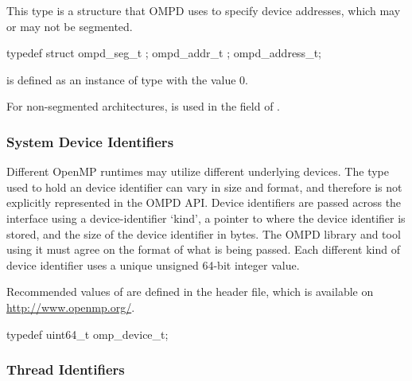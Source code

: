 \label{subsubsubsec:ompd_address_t}

This type is a structure that OMPD uses to specify device addresses,
which may or may not be segmented.

\format

\begin{ccppspecific}
\begin{ompEnv}
typedef struct {
  ompd_seg_t ;
  ompd_addr_t ;
} ompd_address_t;
\end{ompEnv}
\end{ccppspecific}

 is defined as an instance of type  with 
the value 0.

For non-segmented architectures,  is used in the 
 field of .

\subsubsection{System Device Identifiers}

Different OpenMP runtimes may utilize different underlying devices.
The type used to hold an device identifier can vary in size and format, and
therefore is not explicitly represented in the OMPD API. Device identifiers are
passed across the interface using a device-identifier `kind', a pointer to where
the device identifier is stored, and the size of the device identifier in bytes.
The OMPD library and tool using it must agree on the format
of what is being passed.
Each different kind of device identifier uses a unique
unsigned 64-bit integer value.

Recommended values of  are defined in the 
header file, which is available on \url{http://www.openmp.org/}.

\label{ompd:omp_device_t}
\format

\begin{ccppspecific}
\begin{ompSyntax}
typedef uint64_t omp_device_t;
\end{ompSyntax}
\end{ccppspecific}


\subsubsection{Thread Identifiers}

